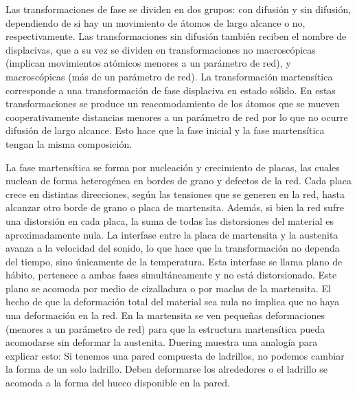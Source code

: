 \documentclass[a4paper,12pt,fleqn,twoside,openany]{book}
\begin{document}
Las transformaciones de fase se dividen en dos grupos:  con difusión y sin difusión, dependiendo de si hay un movimiento de átomos de largo alcance o no,
respectivamente. Las transformaciones sin difusión también reciben el nombre de displacivas, que a su vez se dividen en transformaciones no macroscópicas
(implican movimientos atómicos menores a un parámetro de red), y macroscópicas (más de un parámetro de red).
La transformación martensítica corresponde a una transformación de fase displaciva en estado sólido. En estas transformaciones se produce un reacomodamiento de los átomos que se mueven cooperativamente distancias menores a un parámetro de red 
por lo que no ocurre difusión de largo alcance. Esto hace que la fase inicial y la fase martensítica tengan la misma composición. 



La fase martensítica se forma por nucleación y crecimiento de placas, las cuales nuclean de forma heterogénea en bordes de grano y defectos de la red. 
Cada placa crece en distintas direcciones, según las tensiones que se generen en la red, hasta alcanzar otro borde de grano o placa de martensita. 
Además, si bien la red sufre una distorsión en cada placa, la suma de todas las distorsiones del material es aproximadamente nula. 
La interfase entre la placa de martensita y la austenita avanza a la velocidad del sonido, lo que hace que la transformación no dependa del 
tiempo, sino únicamente de la temperatura. Esta interfase se llama plano de hábito, pertenece a ambas fases 
simultáneamente y no está distorsionado. Este plano se acomoda por medio de cizalladura o por maclas de la martensita. 
El hecho de que la deformación total del material sea nula no implica que no haya una deformación en la red. En la martensita se ven pequeñas 
deformaciones (menores a un parámetro de red) para que la estructura martensítica pueda acomodarse sin deformar la austenita. 
Duering \cite{duering} muestra una analogía para explicar esto: Si tenemos una pared compuesta de ladrillos, no podemos cambiar la forma de un solo ladrillo. 
Deben deformarse los alrededores o el ladrillo se acomoda a la forma del hueco disponible en la pared.

\end{document}
